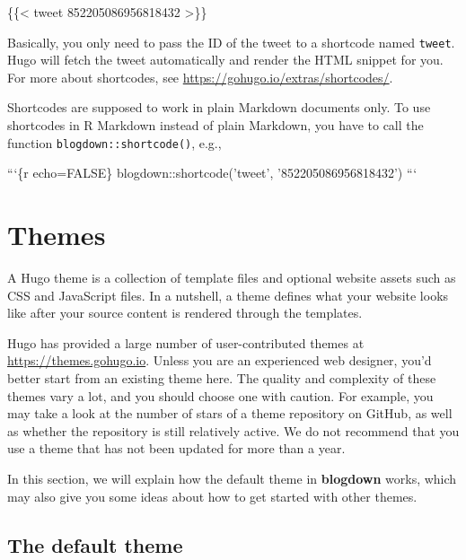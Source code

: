 \documentclass[12pt,]{krantz}
\makeatletter
\newenvironment{Shaded}{\begin{snugshade}}{\end{snugshade}}
\newcommand{\DecValTok}[1]{\textcolor[rgb]{0.00,0.00,0.81}{#1}}
\newcommand{\NormalTok}[1]{#1}
\newenvironment{kframe}{%
\medskip{}
\setlength{\fboxsep}{.8em}
 \def\at@end@of@kframe{}%
 \ifinner\ifhmode%
  \def\at@end@of@kframe{\end{minipage}}%
  \begin{minipage}{\columnwidth}%
 \fi\fi%
 \def\FrameCommand##1{\hskip\@totalleftmargin \hskip-\fboxsep
 \colorbox{shadecolor}{##1}\hskip-\fboxsep
     \hskip-\linewidth \hskip-\@totalleftmargin \hskip\columnwidth}%
 \MakeFramed {\advance\hsize-\width
   \@totalleftmargin\z@ \linewidth\hsize
   \@setminipage}}%
 {\par\unskip\endMakeFramed%
 \at@end@of@kframe}
\renewenvironment{Shaded}{\begin{kframe}}{\end{kframe}}
\theoremstyle{definition}
\theoremstyle{definition}
\theoremstyle{definition}
\theoremstyle{remark}
\makeatother
\begin{document}
\begin{Shaded}
\begin{Highlighting}[]
\NormalTok{\{\{< tweet }\DecValTok{852205086956818432}\NormalTok{ >\}\}}
\end{Highlighting}
\end{Shaded}

Basically, you only need to pass the ID of the tweet to a shortcode
named \texttt{tweet}. Hugo will fetch the tweet automatically and render
the HTML snippet for you. For more about shortcodes, see
\url{https://gohugo.io/extras/shortcodes/}.

Shortcodes are supposed to work in plain Markdown documents only. To use
shortcodes in R Markdown instead of plain Markdown, you have to call the
function \texttt{blogdown::shortcode()}, e.g.,

\begin{Shaded}
\begin{Highlighting}[]
\NormalTok{```\{r echo=FALSE\}}
\NormalTok{blogdown::shortcode('tweet', '852205086956818432')}
\NormalTok{```}
\end{Highlighting}
\end{Shaded}

\hypertarget{themes}{%
\section{Themes}\label{themes}}

A Hugo theme is a collection of template files and
optional website assets such as CSS and JavaScript files. In a nutshell,
a theme defines what your website looks like after your source content
is rendered through the templates.

Hugo has provided a large number of user-contributed themes at
\url{https://themes.gohugo.io}. Unless you are an experienced web
designer, you'd better start from an existing theme here. The quality
and complexity of these themes vary a lot, and you should choose one
with caution. For example, you may take a look at the number of stars of
a theme repository on GitHub, as well as whether the repository is still
relatively active. We do not recommend that you use a theme that has not
been updated for more than a year.

In this section, we will explain how the default theme in
\textbf{blogdown} works, which may also give you some ideas about how to
get started with other themes.

\hypertarget{the-default-theme}{%
\subsection{The default theme}\label{the-default-theme}}
\end{document}
